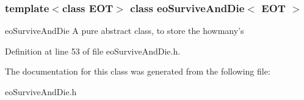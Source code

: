 \subsubsection*{template$<$class EOT$>$ class eo\-Survive\-And\-Die$<$ EOT $>$}

eo\-Survive\-And\-Die A pure abstract class, to store the howmany's 



Definition at line 53 of file eo\-Survive\-And\-Die.h.

The documentation for this class was generated from the following file:\begin{CompactItemize}
\item 
eo\-Survive\-And\-Die.h\end{CompactItemize}
